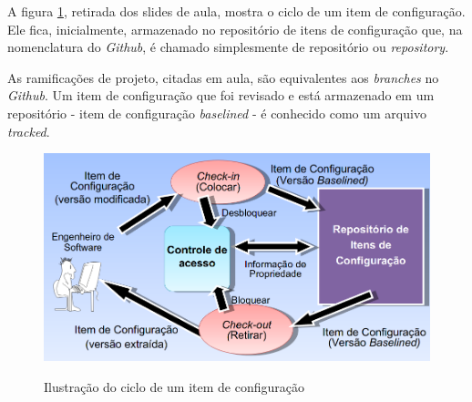 A figura \ref{figura:ciclo}, retirada dos slides de aula, mostra o ciclo de um item de configuração. Ele fica, inicialmente, armazenado no repositório de itens de configuração que, na nomenclatura do \textit{Github}, é chamado simplesmente de repositório ou \textit{repository}.
\par As ramificações de projeto, citadas em aula, são equivalentes aos \textit{branches} no \textit{Github}. Um item de configuração que foi revisado e está armazenado em um repositório - item de configuração \textit{baselined} - é conhecido como um arquivo \textit{tracked}.
\begin{figure}[H]
    \caption{Ilustração do ciclo de um item de configuração}
    \vspace{0.5cm}
    \centering
    \includegraphics[width=15cm]{imagens/ciclo_gerenciamento.png}
    \label{figura:ciclo}
\end{figure}

